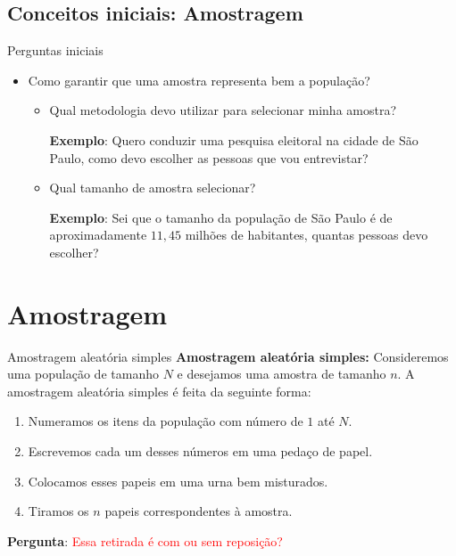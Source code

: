 \subsection{Conceitos iniciais: Amostragem}
\begin{frame}{Perguntas iniciais}
\begin{itemize}
    \item Como garantir que uma amostra representa bem a população?
    \begin{itemize}
        \item Qual metodologia devo utilizar para selecionar minha amostra?
        
        \textbf{Exemplo}: Quero conduzir uma pesquisa eleitoral na cidade de São Paulo, como devo escolher as pessoas que vou entrevistar?
        \pause
        \item Qual tamanho de amostra selecionar?
        
        \textbf{Exemplo}: Sei que o tamanho da população de São Paulo é de aproximadamente $11,45$ milhões de habitantes, quantas pessoas devo escolher? 
    \end{itemize}
\end{itemize}
\end{frame}

\section{Amostragem}

\begin{frame}{Amostragem aleatória simples}
    \textbf{Amostragem aleatória simples:} Consideremos uma população de tamanho $N$ e desejamos uma amostra de tamanho $n$.
    A amostragem aleatória simples é feita da seguinte forma:
    \begin{enumerate}
        \item Numeramos os itens da população com número de $1$ até $N$.
        \pause
        \item Escrevemos cada um desses números em uma pedaço de papel.
        \pause
        \item Colocamos esses papeis em uma urna bem misturados.
        \pause
        \item Tiramos os $n$ papeis correspondentes à amostra. 
    \end{enumerate}
         \pause
\textbf{Pergunta}: \textcolor{red}{Essa retirada é com ou sem reposição?}   
\end{frame}

